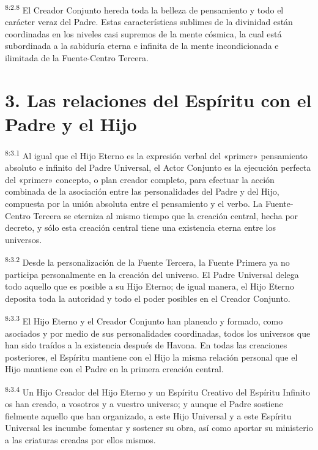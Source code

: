 \par
\textsuperscript{8:2.8} El Creador Conjunto hereda toda la belleza de pensamiento y todo el carácter veraz del Padre. Estas características sublimes de la divinidad están coordinadas en los niveles casi supremos de la mente cósmica, la cual está subordinada a la sabiduría eterna e infinita de la mente incondicionada e ilimitada de la Fuente-Centro Tercera.

\section*{3. Las relaciones del Espíritu con el Padre y el Hijo}
\par
\textsuperscript{8:3.1} Al igual que el Hijo Eterno es la expresión verbal del «primer» pensamiento absoluto e infinito del Padre Universal, el Actor Conjunto es la ejecución perfecta del «primer» concepto, o plan creador completo, para efectuar la acción combinada de la asociación entre las personalidades del Padre y del Hijo, compuesta por la unión absoluta entre el pensamiento y el verbo. La Fuente-Centro Tercera se eterniza al mismo tiempo que la creación central, hecha por decreto, y sólo esta creación central tiene una existencia eterna entre los universos.

\par
\textsuperscript{8:3.2} Desde la personalización de la Fuente Tercera, la Fuente Primera ya no participa personalmente en la creación del universo. El Padre Universal delega todo aquello que es posible a su Hijo Eterno; de igual manera, el Hijo Eterno deposita toda la autoridad y todo el poder posibles en el Creador Conjunto.

\par
\textsuperscript{8:3.3} El Hijo Eterno y el Creador Conjunto han planeado y formado, como asociados y por medio de sus personalidades coordinadas, todos los universos que han sido traídos a la existencia después de Havona. En todas las creaciones posteriores, el Espíritu mantiene con el Hijo la misma relación personal que el Hijo mantiene con el Padre en la primera creación central.

\par
\textsuperscript{8:3.4} Un Hijo Creador del Hijo Eterno y un Espíritu Creativo del Espíritu Infinito os han creado, a vosotros y a vuestro universo; y aunque el Padre sostiene fielmente aquello que han organizado, a este Hijo Universal y a este Espíritu Universal les incumbe fomentar y sostener su obra, así como aportar su ministerio a las criaturas creadas por ellos mismos.

